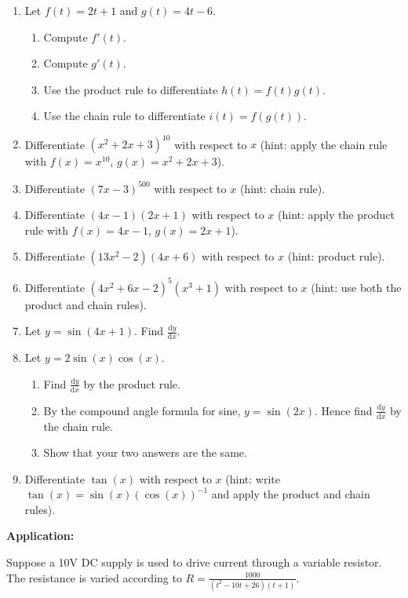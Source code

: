 \documentclass{article}
\newcommand{\deriv}[2]{\frac{\mathrm{d}#1}{\mathrm{d}#2}}
\begin{document}
\begin{enumerate}
	\item Let $f(t)=2t+1$ and $g(t)=4t-6$.
		\begin{enumerate}
			\item Compute $f'(t)$.
			\item Compute $g'(t)$.
			\item Use the product rule to differentiate $h(t)=f(t)g(t)$.
			\item Use the chain rule to differentiate $i(t)=f(g(t))$.
		\end{enumerate}
	\item Differentiate $(x^2+2x+3)^{10}$ with respect to $x$ (hint: apply the chain rule with $f(x)=x^{10}$, $g(x)=x^2+2x+3$).
	\item Differentiate $(7x-3)^{500}$ with respect to $x$ (hint: chain rule).
	\item Differentiate $(4x-1)(2x+1)$ with respect to $x$ (hint: apply the product rule with $f(x)=4x-1$, $g(x)=2x+1$).
	\item Differentiate $(13x^2-2)(4x+6)$ with respect to $x$ (hint: product rule).
	\item Differentiate $(4x^2+6x-2)^5(x^3+1)$ with respect to $x$ (hint: use both the product and chain rules).
	\item Let $y=\sin(4x+1)$. Find $\deriv{y}{x}$.
	\item Let $y=2\sin(x)\cos(x)$.
		\begin{enumerate}
			\item Find $\deriv{y}{x}$ by the product rule.
			\item By the compound angle formula for sine, $y=\sin(2x)$. Hence find $\deriv{y}{x}$ by the chain rule.
			\item Show that your two answers are the same.
		\end{enumerate}
	\item Differentiate $\tan(x)$ with respect to $x$ (hint: write $\tan(x)=\sin(x)(\cos(x))^{-1}$ and apply the product and chain rules).
\end{enumerate}



\clearpage




\textbf{Application:}

\vspace{5mm}


Suppose a 10V DC supply is used to drive current through a variable resistor. The resistance is varied according to $R=\frac{1000}{(t^2-10t+26)(t+1)}$.
\end{document}
